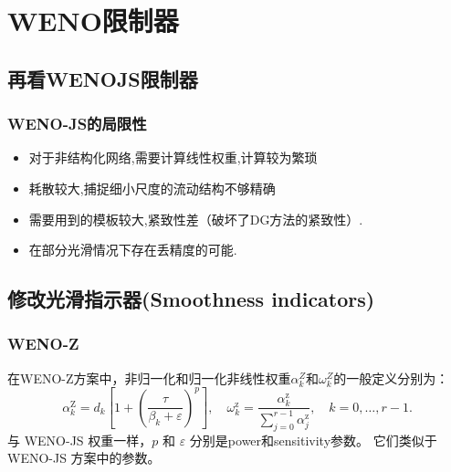 \documentclass{book}
\begin{document}
\section{WENO限制器}

\subsection{再看WENOJS限制器}
\begin{figure}
    \centering
    
\end{figure}


\subsubsection{WENO-JS的局限性}
\begin{itemize}
    \item 对于非结构化网络,需要计算线性权重,计算较为繁琐
    \item 耗散较大,捕捉细小尺度的流动结构不够精确
    \item 需要用到的模板较大,紧致性差（破坏了DG方法的紧致性）.
    \item 在部分光滑情况下存在丢精度的可能.
\end{itemize}
\subsection{修改光滑指示器(Smoothness indicators)}
\subsubsection{WENO-Z}
在WENO-Z方案中，非归一化和归一化非线性权重$\alpha_{k}^{Z}$和$\omega_{k}^{Z}$的一般定义分别为：
\begin{equation}
    \alpha_{k}^{\mathrm{Z}}=d_{k}\left[1+\left(\frac{\tau}{\beta_{k}+\varepsilon}\right)^{p}\right], \quad \omega_{k}^{\mathrm{z}}=\frac{\alpha_{k}^{\mathrm{z}}}{\sum_{j=0}^{r-1} \alpha_{j}^{\mathrm{z}}}, \quad k=0, \ldots, r-1 .
\end{equation}
与 WENO-JS 权重一样，$p$ 和 $\varepsilon$ 分别是power和sensitivity参数。 它们类似于 WENO-JS 方案中的参数。
\end{document}
